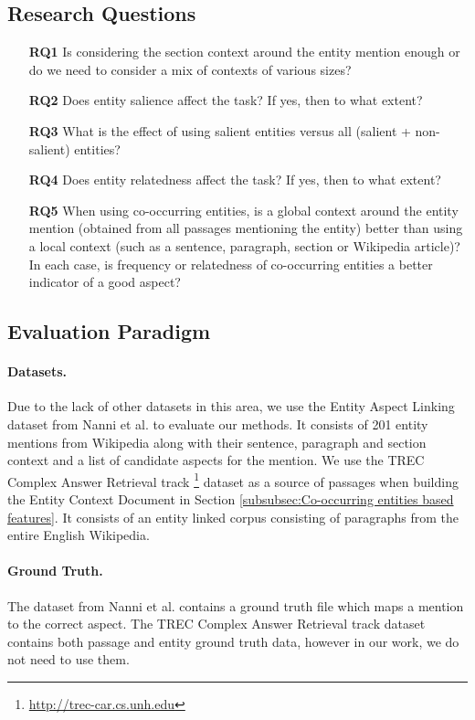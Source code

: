 \documentclass[sigconf,authordraft]{acmart}
\begin{document}
\subsection{Research Questions}
\label{subsec:Research Questions}

\begin{itemize}
\item[\textbf{RQ1}] Is considering the section context around the entity mention enough or do we need to consider a mix of contexts of various sizes?
\item[\textbf{RQ2}] Does entity salience affect the task? If yes, then to what extent?
\item[\textbf{RQ3}] What is the effect of using salient entities versus all (salient + non-salient) entities? 
\item[\textbf{RQ4}] Does entity relatedness affect the task? If yes, then to what extent? 
\item[\textbf{RQ5}] When using co-occurring entities, is a global context around the entity mention (obtained from all passages mentioning the entity) better than using a local context (such as a sentence, paragraph, section or Wikipedia article)? In each case, is frequency or relatedness of co-occurring entities a better indicator of a good aspect?
\end{itemize}

\subsection{Evaluation Paradigm}
\label{subsec:Evaluation Paradigm}

\paragraph{\textbf{Datasets.}}
Due to the lack of other datasets in this area, we use the Entity Aspect Linking dataset from Nanni et al.\cite{nanni2018entity} to evaluate our methods. It consists of 201 entity mentions from Wikipedia along with their sentence, paragraph and section context and a list of candidate aspects for the mention.  We use the TREC Complex Answer Retrieval track \cite{dietz2018trec}\footnote{\url{http://trec-car.cs.unh.edu}} dataset as a source of passages when building the Entity Context Document in Section \ref{subsubsec:Co-occurring entities based features}. It consists of an entity linked corpus consisting of paragraphs from the entire English Wikipedia.

\paragraph{\textbf{Ground Truth.}} The dataset from Nanni et al. \cite{nanni2018entity} contains a ground truth file which maps a mention to the correct aspect. The TREC Complex Answer Retrieval track \cite{dietz2018trec} dataset contains both passage and entity ground truth data, however in our work, we do not need to use them. 
\end{document}
